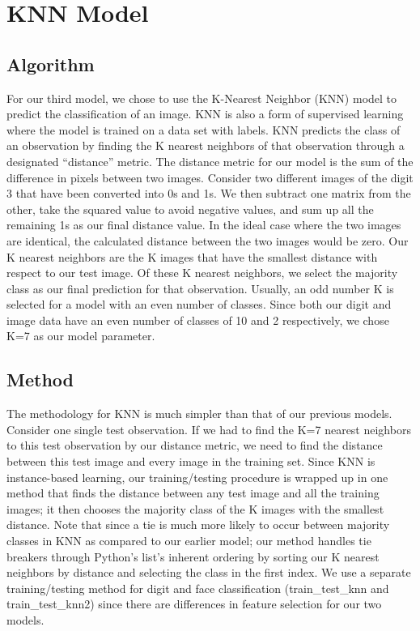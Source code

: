 \documentclass[10pt,parskip=half,
toc=sectionentrywithdots,
bibliography=totocnumbered,
captions=tableheading,numbers=noendperiod]{scrartcl}
\begin{document}
\hypertarget{knn-model}{%
\section{KNN Model}\label{knn-model}}

\hypertarget{algorithm}{%
\subsection{Algorithm}\label{algorithm}}

For our third model, we chose to use the K-Nearest Neighbor (KNN) model
to predict the classification of an image. KNN is also a form of
supervised learning where the model is trained on a data set with
labels. KNN predicts the class of an observation by finding the K
nearest neighbors of that observation through a designated ``distance''
metric. The distance metric for our model is the sum of the difference
in pixels between two images. Consider two different images of the digit
3 that have been converted into 0s and 1s. We then subtract one matrix
from the other, take the squared value to avoid negative values, and sum
up all the remaining 1s as our final distance value. In the ideal case
where the two images are identical, the calculated distance between the
two images would be zero. Our K nearest neighbors are the K images that
have the smallest distance with respect to our test image. Of these K
nearest neighbors, we select the majority class as our final prediction
for that observation. Usually, an odd number K is selected for a model
with an even number of classes. Since both our digit and image data have
an even number of classes of 10 and 2 respectively, we chose K=7 as our
model parameter.

\hypertarget{method}{%
\subsection{Method}\label{method}}

The methodology for KNN is much simpler than that of our previous
models. Consider one single test observation. If we had to find the K=7
nearest neighbors to this test observation by our distance metric, we
need to find the distance between this test image and every image in the
training set. Since KNN is instance-based learning, our training/testing
procedure is wrapped up in one method that finds the distance between
any test image and all the training images; it then chooses the majority
class of the K images with the smallest distance. Note that since a tie
is much more likely to occur between majority classes in KNN as compared
to our earlier model; our method handles tie breakers through Python's
list's inherent ordering by sorting our K nearest neighbors by distance
and selecting the class in the first index. We use a separate
training/testing method for digit and face classification
(train\_test\_knn and train\_test\_knn2) since there are differences in
feature selection for our two models.
\end{document}

